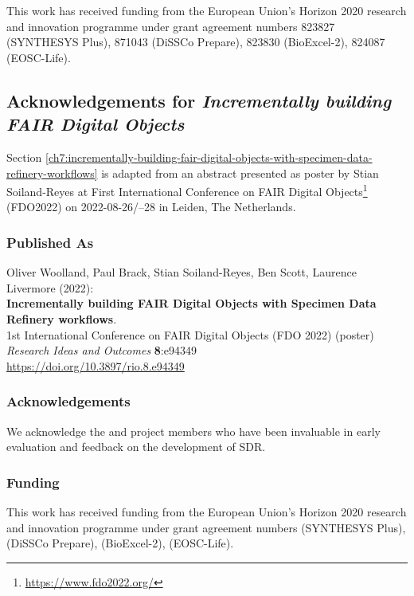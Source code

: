 This work has received funding from the European Union's Horizon 2020
research and innovation programme under grant agreement numbers 823827
(SYNTHESYS Plus), 871043 (DiSSCo Prepare), 823830 (BioExcel-2), 824087
(EOSC-Life).




\subsection{Acknowledgements for \emph{Incrementally building FAIR Digital Objects}}\label{ch11:incrementally-fdo}

Section \vref{ch7:incrementally-building-fair-digital-objects-with-specimen-data-refinery-workflows}  is adapted from an abstract
presented as poster by Stian Soiland-Reyes at 
First International Conference on FAIR Digital Objects\footnote{\url{https://www.fdo2022.org/}}
(FDO2022) on
2022-08-26/--28 in Leiden, The Netherlands. 

\subsubsection*{Published As}

Oliver Woolland, Paul Brack, Stian Soiland-Reyes, Ben Scott, Laurence
Livermore (2022):\\
\textbf{Incrementally building FAIR Digital Objects with Specimen Data
Refinery workflows}.\\
1st International Conference on FAIR Digital Objects
(FDO 2022) (poster)\\
\emph{Research Ideas and Outcomes} \textbf{8}:e94349\\
\url{https://doi.org/10.3897/rio.8.e94349}


\subsubsection*{Acknowledgements}

We acknowledge the  and
 project members who have been
invaluable in early evaluation and feedback on the development of SDR.

\hypertarget{funding-2}{%
\subsubsection*{Funding}\label{funding-2}}

This work has received funding from the European Union's Horizon 2020
research and innovation programme under grant agreement numbers
(SYNTHESYS Plus),  (DiSSCo
Prepare),  (BioExcel-2),
 (EOSC-Life).







